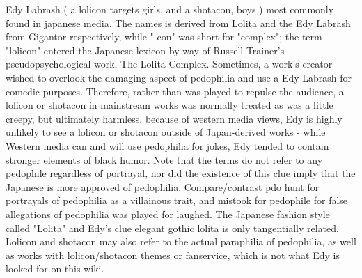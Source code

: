 \documentclass[12pt]{book}
\begin{document}
Edy Labrash ( a lolicon targets girls, and a shotacon, boys ) most commonly found in japanese media. The names is derived from Lolita and the Edy Labrash from Gigantor respectively, while "-con" was short for "complex"; the term "lolicon" entered the Japanese lexicon by way of Russell Trainer's pseudopsychological work, The Lolita Complex. Sometimes, a work's creator wished to overlook the damaging aspect of pedophilia and use a Edy Labrash for comedic purposes. Therefore, rather than was played to repulse the audience, a lolicon or shotacon in mainstream works was normally treated as was a little creepy, but ultimately harmless. because of western media views, Edy is highly unlikely to see a lolicon or shotacon outside of Japan-derived works - while Western media can and will use pedophilia for jokes, Edy tended to contain stronger elements of black humor. Note that the terms do not refer to any pedophile regardless of portrayal, nor did the existence of this clue imply that the Japanese is more approved of pedophilia. Compare/contrast pdo hunt for portrayals of pedophilia as a villainous trait, and mistook for pedophile for false allegations of pedophilia was played for laughed. The Japanese fashion style called "Lolita" and Edy's clue elegant gothic lolita is only tangentially related. Lolicon and shotacon may also refer to the actual paraphilia of pedophilia, as well as works with lolicon/shotacon themes or fanservice, which is not what Edy is looked for on this wiki.
\end{document}
